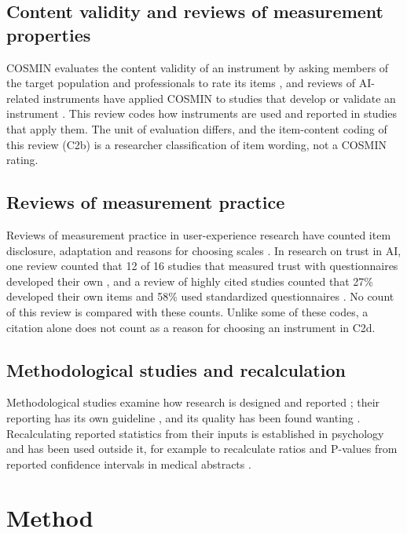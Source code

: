 \documentclass[11pt]{article}
\begin{document}
\subsection{Content validity and reviews of measurement properties}
COSMIN evaluates the content validity of an instrument by asking members of the target population and professionals to
rate its items \citep{terwee2018}, and reviews of AI-related instruments have applied COSMIN to studies that develop or
validate an instrument \citep{lintner2024}. This review codes how instruments are used and reported in studies that
apply them. The unit of evaluation differs, and the item-content coding of this review (C2b) is a researcher
classification of item wording, not a COSMIN rating.

\subsection{Reviews of measurement practice}
Reviews of measurement practice in user-experience research have counted item disclosure, adaptation and reasons for
choosing scales \citep{perrig2024}. In research on trust in AI, one review counted that 12 of 16 studies that measured
trust with questionnaires developed their own \citep{bach2022}, and a review of highly cited studies counted that 27\%
developed their own items and 58\% used standardized questionnaires \citep{benk2024}. No count of this review is
compared with these counts. Unlike some of these codes, a citation alone does not count as a reason for choosing an
instrument in C2d.

\subsection{Methodological studies and recalculation}
Methodological studies examine how research is designed and reported \citep{mbuagbaw2020}; their reporting has its own
guideline \citep{murad2017}, and its quality has been found wanting \citep{long2024}. Recalculating reported statistics
from their inputs is established in psychology \citep{nuijten2016} and has been used outside it, for example to
recalculate ratios and P-values from reported confidence intervals in medical abstracts \citep{georgescu2018}.

\section{Method}
\end{document}
